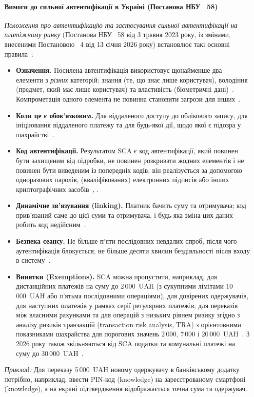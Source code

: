 \paragraph{Вимоги до сильної автентифікації в Україні (Постанова НБУ \No~58)}
\emph{Положення про автентифікацію та застосування сильної автентифікації на платіжному ринку} (Постанова НБУ 
\No~58 від 3 травня 2023 року, із змінами, внесеними Постановою \No~4 від 13 січня 2026 року) встановлює такі 
основні правила~\cite{nbu58, nbu4_2026}:
\begin{itemize}[noitemsep]
    \item \textbf{Означення.} Посилена автентифікація використовує щонайменше два елементи з \emph{різних} категорій: 
        знання (те, що знає лише користувач), володіння (предмет, який має лише користувач) та властивість 
        (біометричні дані)~\cite[п.~3(15)]{nbu58}. Компрометація одного елемента не повинна становити загрози 
        для інших~\cite[п.~32]{nbu58}.
    \item \textbf{Коли це є обов'язковим.} Для віддаленого доступу до облікового запису, для ініціювання віддаленого 
        платежу та для будь-якої дії, щодо якої є підозра у шахрайстві~\cite[п.~7, 15]{nbu58}.
    \item \textbf{Код автентифікації.} Результатом SCA є код автентифікації, який повинен бути захищеним від підробки, 
        не повинен розкривати жодних елементів і не повинен бути виведеним із попередніх кодів; він реалізується 
        за допомогою одноразових паролів, (кваліфікованих) електронних підписів або інших криптографічних засобів~\cite[п.~14, 16]{nbu58}, \cite{nbu4_2026}.
    \item \textbf{Динамічне зв'язування (linking).} Платник бачить суму та отримувача; код прив'язаний саме до цієї 
        суми та отримувача, і будь-яка зміна цих даних робить код недійсним~\cite[п.~22]{nbu58}.
    \item \textbf{Безпека сеансу.} Не більше п'яти послідовних невдалих спроб, після чого аутентифікація блокується; 
        не більше десяти хвилин бездіяльності після входу в систему~\cite[п.~17]{nbu58}.
    \item \textbf{Винятки (Exemptions).} SCA можна пропустити, наприклад, для дистанційних платежів на суму до 
    2\,000~UAH (з сукупними лімітами 10\,000~UAH або п'ятьма послідовними операціями), для довірених одержувачів, 
    для наступних платежів у рамках серії регулярних платежів, для переказів між власними рахунками та для операцій 
    з низьким рівнем ризику згідно з аналізу ризиків транзакцій (transaction risk analysis, TRA) з орієнтовними 
    показниками шахрайства для порогових значень 2\,000, 7\,000 і 20\,000~UAH~\cite[п.~37--47, Додаток]{nbu58}. 
    З 2026 року також звільняються від SCA податки та комунальні платежі на суму до 30\,000~UAH~\cite{nbu4_2026}.
\end{itemize}
\textit{Приклад:} Для переказу 5\,000~UAH новому одержувачу в банківському додатку потрібно, наприклад, ввести 
PIN-код (knowledge) на зареєстрованому смартфоні (knowledge), а на екрані підтвердження відображається точна сума 
та одержувач.

